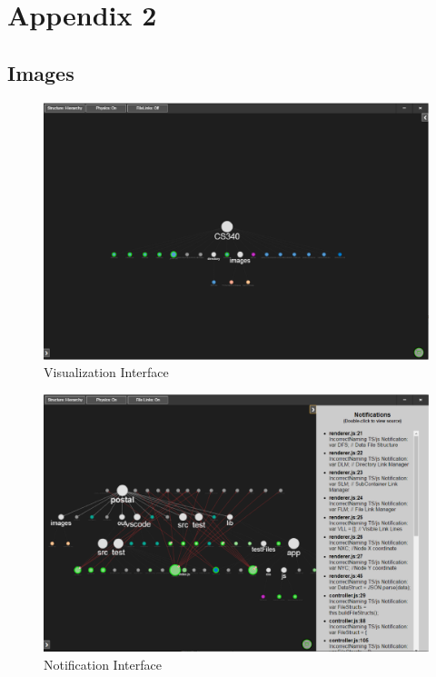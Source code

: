 \documentclass[letterpaper,10pt,titlepage,draftclsnofoot,onecolumn,onesided] {IEEEtran}
\begin{document}
\pagebreak
\section{Appendix 2}	
\subsection{Images}
	\begin{figure}[H]
		\includegraphics[width=500px]{PostalUI}
		\caption{Visualization Interface}  
	\end{figure}
	
	\begin{figure}[H]
		\includegraphics[width=500px]{PostalNotification}
		\caption{Notification Interface}  
	\end{figure}
	
\pagebreak


\end{document}
